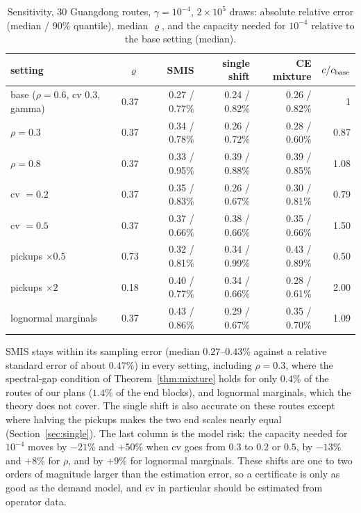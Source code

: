 \documentclass[ijoc,sglanonrev]{informs4}
\begin{document}
\begin{APPENDICES}
\begin{table}[t]
\centering\small
\caption{Sensitivity, 30 Guangdong routes, $\gamma=10^{-4}$, $2\times10^5$
draws: absolute relative error (median / 90\% quantile), median $\varrho$,
and the capacity needed for $10^{-4}$ relative to the base setting (median).}
\label{tab:sens}
\begin{tabular}{lrrrrr}
\toprule
setting & $\varrho$ & SMIS & single shift & CE mixture & $c/c_{\rm base}$ \\
\midrule
base ($\rho=0.6$, cv $0.3$, gamma) & 0.37 & 0.27 / 0.77\% & 0.24 / 0.82\% & 0.26 / 0.82\% & 1 \\
$\rho=0.3$ & 0.37 & 0.34 / 0.78\% & 0.26 / 0.72\% & 0.28 / 0.60\% & 0.87 \\
$\rho=0.8$ & 0.37 & 0.33 / 0.95\% & 0.39 / 0.88\% & 0.39 / 0.85\% & 1.08 \\
cv $=0.2$ & 0.37 & 0.35 / 0.83\% & 0.26 / 0.67\% & 0.30 / 0.81\% & 0.79 \\
cv $=0.5$ & 0.37 & 0.37 / 0.66\% & 0.38 / 0.66\% & 0.35 / 0.66\% & 1.50 \\
pickups $\times0.5$ & 0.73 & 0.32 / 0.81\% & 0.34 / 0.99\% & 0.43 / 0.89\% & 0.50 \\
pickups $\times2$ & 0.18 & 0.40 / 0.77\% & 0.34 / 0.66\% & 0.28 / 0.61\% & 2.00 \\
lognormal marginals & 0.37 & 0.43 / 0.86\% & 0.29 / 0.67\% & 0.35 / 0.70\% & 1.09 \\
\bottomrule
\end{tabular}
\end{table}

SMIS stays within its sampling error (median $0.27$--$0.43\%$ against a
relative standard error of about $0.47\%$) in every setting, including
$\rho=0.3$, where the spectral-gap condition of Theorem~\ref{thm:mixture}
holds for only $0.4\%$ of the routes of our plans ($1.4\%$ of the end blocks), and lognormal
marginals, which the theory does not cover. The single shift is also accurate
on these routes except where halving the pickups makes the two end scales
nearly equal (Section~\ref{sec:single}). The last column is the model risk:
the capacity needed for $10^{-4}$ moves by $-21\%$ and $+50\%$ when cv goes
from $0.3$ to $0.2$ or $0.5$, by $-13\%$ and $+8\%$ for $\rho$, and by $+9\%$
for lognormal marginals. These shifts are one to two orders of magnitude
larger than the estimation error, so a certificate is only as good as the
demand model, and cv in particular should be estimated from operator data.



\end{APPENDICES}
\end{document}

